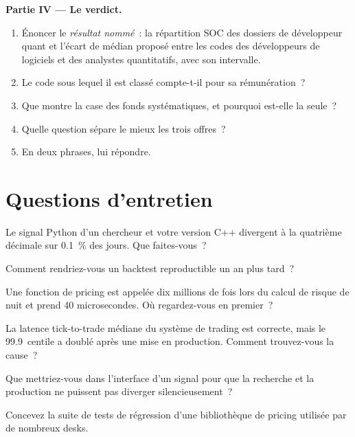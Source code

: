 \begin{problem}
\medskip\noindent\textbf{Partie IV --- Le verdict.}
\begin{enumerate}[resume]
\item Énoncer le \emph{résultat nommé}~: la répartition SOC des dossiers de développeur quant et l'écart de  médian proposé
entre les codes des développeurs de logiciels et des analystes quantitatifs, avec son intervalle.
\item Le code sous lequel il est classé compte-t-il pour sa rémunération~?
\item Que montre la case des fonds systématiques, et pourquoi est-elle la seule~?
\item Quelle question sépare le mieux les trois offres~?
\item En deux phrases, lui répondre.
\end{enumerate}
\end{problem}

\section{Questions d'entretien}

\begin{interviewq}\label{iq:in:quant-developer:1}
Le signal Python d'un chercheur et votre version C++ divergent à la quatrième décimale sur 0.1~\% des jours. Que faites-vous~?
\end{interviewq}

\begin{interviewq}\label{iq:in:quant-developer:2}
Comment rendriez-vous un backtest reproductible un an plus tard~?
\end{interviewq}

\begin{interviewq}\label{iq:in:quant-developer:3}
Une fonction de pricing est appelée dix millions de fois lors du calcul de risque de nuit et prend 40 microsecondes. Où regardez-vous en premier~?
\end{interviewq}

\begin{interviewq}\label{iq:in:quant-developer:4}
La latence tick-to-trade médiane du système de trading est correcte, mais le 99.9~centile a doublé après une mise en production. Comment trouvez-vous
la cause~?
\end{interviewq}

\begin{interviewq}\label{iq:in:quant-developer:5}
Que mettriez-vous dans l'interface d'un signal pour que la recherche et la production ne puissent pas diverger silencieusement~?
\end{interviewq}

\begin{interviewq}\label{iq:in:quant-developer:6}
Concevez la suite de tests de régression d'une bibliothèque de pricing utilisée par de nombreux desks.
\end{interviewq}
